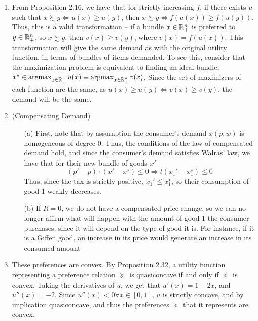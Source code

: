 \documentclass[12pt]{article}
\begin{document}
\begin{enumerate}
\item From Proposition 2.16, we have that for strictly increasing $f$, if there exists $u$ such that $x \succsim y \Leftrightarrow u(x) \ge u(y)$, then $x \succsim y \Leftrightarrow f(u(x)) \ge f(u(y))$. Thus, this is a valid transformation -- if a bundle $x \in \mathbb{R}^n_+$ is preferred to $y \in \mathbb{R}^n_+$, so $x \succsim y$, then $v(x) \ge v(y)$, where $v(x) = f(u(x))$. This transformation will give the same demand as with the original utility function, in terms of bundles of items demanded. To see this, consider that the maximization problem is equivalent to finding an ideal bundle, $x^\star \in \mathop{\rm argmax}_{x \in \mathbb{R}^n_+} u(x) \equiv \mathop{\rm argmax}_{x \in \mathbb{R}^n_+} v(x)$. Since the set of maximizers of each function are the same, as $u(x) \ge u(y) \Leftrightarrow v(x) \ge v(y)$, the demand will be the same.

\item (Compensating Demand)

\begin{itemize}
	\item[(a)] First, note that by assumption the consumer's demand $x(p,w)$ is homogeneous of degree 0. Thus, the conditions of the law of compensated demand hold, and since the consumer's demand satisfies Walras' law, we have that for their new bundle of goods $x'$
	\[
	(p' - p ) \cdot (x' - x^\star) \le 0 \Longrightarrow t(x_1' - x_1^\star) \le 0
	\]
	Thus, since the tax is strictly positive, $x_1' \le x_1^\star$, so their consumption of good 1 weakly decreases.
	
	\item[(b)] If $R = 0$, we do not have a compensated price change, so we can no longer affirm what will happen with the amount of good 1 the consumer purchases, since it will depend on the type of good it is. For instance, if it is a Giffen good, an increase in its price would generate an increase in its consumed amount
\end{itemize}

\item These preferences are convex. By Proposition 2.32, a utility function representing a preference relation $\succeq$ is quasiconcave if and only if $\succeq$ is convex. Taking the derivatives of $u$, we get that $u'(x) = 1 - 2x$, and $u''(x) = -2$. Since $u''(x) < 0 \forall x \in [0,1]$, $u$ is strictly concave, and by implication quasiconcave, and thus the preferences $\succeq$ that it represents are convex.


\end{enumerate}
\end{document}
